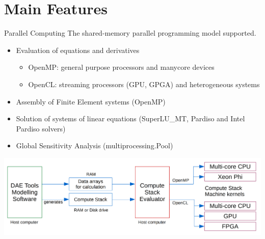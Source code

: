 \documentclass[compress,newPxFont,sthlmFooter]{beamer}
\begin{document}

\section{Main Features}

\begin{frame}[plain]{Parallel Computing}
    The \alert{shared-memory} parallel programming model supported.
    \begin{itemize}
      \item \alert{Evaluation of equations and derivatives} 
         \begin{itemize}
            \item \alert{OpenMP}: general purpose processors and manycore devices
            \item \alert{OpenCL}: streaming processors (GPU, GPGA) and heterogeneous systems
         \end{itemize}   
      \item \alert{Assembly of Finite Element systems} (OpenMP)
      \item \alert{Solution of systems of linear equations} (SuperLU\_MT, Pardiso and Intel Pardiso solvers)
      \item \alert{Global Sensitivity Analysis} (multiprocessing.Pool)
    \end{itemize}
    \begin{center}
        \includegraphics[align=c, height=0.30\paperheight]{Compute-Stack-Evaluator.png}
    \end{center}
\end{frame}
\end{document}
